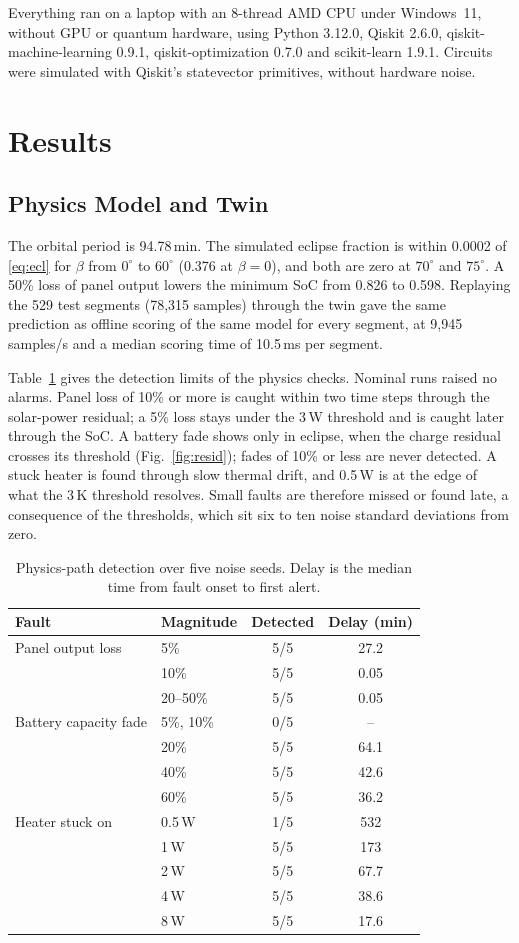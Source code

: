 \documentclass[conference]{IEEEtran}
\begin{document}
Everything ran on a laptop with an 8-thread AMD CPU under Windows~11, without GPU or quantum
hardware, using Python 3.12.0, Qiskit 2.6.0, qiskit-machine-learning 0.9.1,
qiskit-optimization 0.7.0 and scikit-learn 1.9.1. Circuits were simulated with Qiskit's
statevector primitives, without hardware noise.

\section{Results}
\subsection{Physics Model and Twin}
The orbital period is 94.78\,min. The simulated eclipse fraction is within 0.0002 of
\eqref{eq:ecl} for $\beta$ from $0^{\circ}$ to $60^{\circ}$ (0.376 at $\beta = 0$), and both
are zero at $70^{\circ}$ and $75^{\circ}$. A 50\% loss of panel output lowers the minimum SoC
from 0.826 to 0.598. Replaying the 529 test segments (78,315 samples) through the twin gave
the same prediction as offline scoring of the same model for every segment, at 9,945
samples/s and a median scoring time of 10.5\,ms per segment.

Table~\ref{tab:faults} gives the detection limits of the physics checks. Nominal runs raised
no alarms. Panel loss of 10\% or more is caught within two time steps through the solar-power
residual; a 5\% loss stays under the 3\,W threshold and is caught later through the SoC. A
battery fade shows only in eclipse, when the charge residual crosses its threshold
(Fig.~\ref{fig:resid}); fades of 10\% or less are never detected. A stuck heater is found
through slow thermal drift, and 0.5\,W is at the edge of what the 3\,K threshold resolves.
Small faults are therefore missed or found late, a consequence of the thresholds, which sit
six to ten noise standard deviations from zero.

\begin{table}[t]
\caption{Physics-path detection over five noise seeds. Delay is the median time from fault
onset to first alert.}
\label{tab:faults}
\centering
\begin{tabular}{llcc}
\toprule
Fault & Magnitude & Detected & Delay (min) \\
\midrule
Panel output loss & 5\% & 5/5 & 27.2 \\
 & 10\% & 5/5 & 0.05 \\
 & 20--50\% & 5/5 & 0.05 \\
\midrule
Battery capacity fade & 5\%, 10\% & 0/5 & -- \\
 & 20\% & 5/5 & 64.1 \\
 & 40\% & 5/5 & 42.6 \\
 & 60\% & 5/5 & 36.2 \\
\midrule
Heater stuck on & 0.5\,W & 1/5 & 532 \\
 & 1\,W & 5/5 & 173 \\
 & 2\,W & 5/5 & 67.7 \\
 & 4\,W & 5/5 & 38.6 \\
 & 8\,W & 5/5 & 17.6 \\
\bottomrule
\end{tabular}
\end{table}
\end{document}
